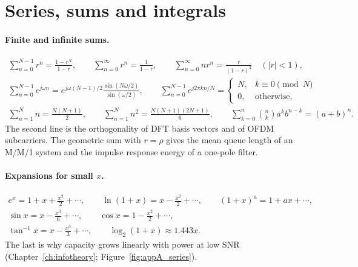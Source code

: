 \section{Series, sums and integrals}
\label{sec:appA:series}

\paragraph{Finite and infinite sums.}
\begin{gather}
\sum_{n=0}^{N-1}r^n=\frac{1-r^N}{1-r},\qquad \sum_{n=0}^{\infty}r^n=\frac1{1-r},\qquad
\sum_{n=0}^{\infty}nr^n=\frac{r}{(1-r)^2}\quad(|r|<1),\\
\sum_{n=0}^{N-1}e^{j\omega n}=e^{j\omega(N-1)/2}\frac{\sin(N\omega/2)}{\sin(\omega/2)},\qquad
\sum_{n=0}^{N-1}e^{j2\pi kn/N}=\begin{cases}N,&k\equiv0\pmod N\\0,&\text{otherwise,}\end{cases}\\
\sum_{n=1}^{N}n=\frac{N(N+1)}{2},\qquad\sum_{n=1}^{N}n^2=\frac{N(N+1)(2N+1)}{6},\qquad
\sum_{k=0}^{n}\binom nk a^kb^{n-k}=(a+b)^n.
\end{gather}
The second line is the orthogonality of DFT basis vectors and of OFDM subcarriers. The geometric
sum with $r=\rho$ gives the mean queue length of an M/M/1 system and the impulse response energy
of a one-pole filter.

\paragraph{Expansions for small $x$.}
\begin{gather}
e^x=1+x+\tfrac{x^2}{2}+\cdots,\qquad \ln(1+x)=x-\tfrac{x^2}2+\cdots,\qquad (1+x)^a=1+ax+\cdots,\\
\sin x=x-\tfrac{x^3}{6}+\cdots,\qquad \cos x=1-\tfrac{x^2}2+\cdots,\\
\tan^{-1}x=x-\tfrac{x^3}3+\cdots,\qquad \log_2(1+x)\approx1.443x .
\end{gather}
The last is why capacity grows linearly with power at low SNR (Chapter~\ref{ch:infotheory};
Figure~\ref{fig:appA_series}).

